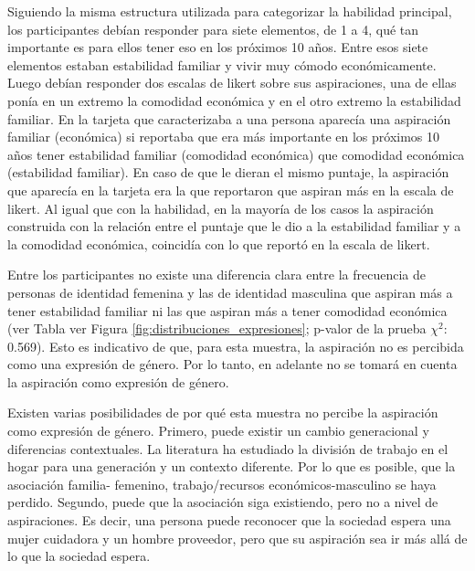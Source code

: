 Siguiendo la misma estructura utilizada para categorizar la habilidad principal,  los participantes debían responder para siete elementos, de 1 a 4,  qué tan importante es para ellos tener eso en los próximos 10 años. Entre esos siete elementos estaban estabilidad familiar y vivir muy cómodo económicamente. Luego debían responder dos escalas de likert sobre sus aspiraciones, una de ellas ponía en un extremo la comodidad económica y en el otro extremo la estabilidad familiar. En la tarjeta que caracterizaba a una persona aparecía una aspiración familiar (económica) si reportaba que era más importante en los próximos 10 años tener estabilidad familiar (comodidad económica) que comodidad económica (estabilidad familiar). En caso de que le dieran el mismo puntaje, la aspiración que aparecía en la tarjeta era la que reportaron que aspiran más en la escala de likert. Al igual que con la habilidad, en la mayoría de los casos la aspiración construida con la relación entre el puntaje que le dio a la estabilidad familiar y a la comodidad económica, coincidía con lo que reportó en la escala de likert. 

Entre los participantes no existe una diferencia clara entre la frecuencia de personas de identidad femenina y las de identidad masculina que aspiran más a tener estabilidad familiar ni las que aspiran más a tener comodidad económica (ver Tabla ver Figura \ref{fig:distribuciones_expresiones};  p-valor de la prueba $\chi^2$: 0.569). Esto es indicativo de que, para esta muestra, la aspiración no es percibida como una expresión de género. Por lo tanto, en adelante no se tomará en cuenta la aspiración como expresión de género. 

Existen varias posibilidades de por qué esta muestra no percibe la aspiración como expresión de género. Primero, puede existir un cambio generacional y diferencias contextuales. La literatura ha estudiado la división de trabajo en el hogar para una generación y un contexto diferente. Por lo que es posible, que la asociación familia- femenino, trabajo/recursos económicos-masculino se haya perdido. Segundo, puede que la asociación siga existiendo, pero no a nivel de aspiraciones. Es decir, una persona puede reconocer que la sociedad espera una mujer cuidadora y un hombre proveedor, pero que su aspiración sea ir más allá de lo que la sociedad espera. 

